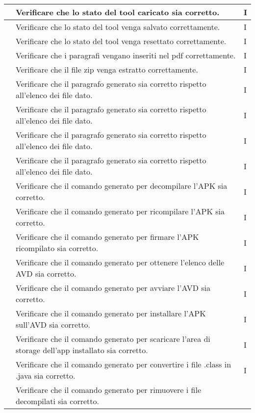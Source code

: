 \begin{longtable}{ |C{1.5cm} | C{8.5cm}| C{1.5cm} |}
     & Verificare che lo stato del tool caricato sia corretto.
    & I \\\hline
     & Verificare che lo stato del tool venga salvato correttamente.
    & I \\\hline
     & Verificare che lo stato del tool venga resettato correttamente.
    & I \\\hline
     & Verificare che i paragrafi vengano inseriti nel pdf correttamente.
    & I \\\hline
     & Verificare che il file zip venga estratto correttamente.
    & I \\\hline
     & Verificare che il paragrafo generato sia corretto rispetto all'elenco dei file dato.
    & I \\\hline
     & Verificare che il paragrafo generato sia corretto rispetto all'elenco dei file dato.
    & I \\\hline
     & Verificare che il paragrafo generato sia corretto rispetto all'elenco dei file dato.
    & I \\\hline
     & Verificare che il paragrafo generato sia corretto rispetto all'elenco dei file dato.
    & I \\\hline
     & Verificare che il comando generato per decompilare l'APK sia corretto.
    & I \\\hline
     & Verificare che il comando generato per ricompilare l'APK sia corretto.
    & I \\\hline
     & Verificare che il comando generato per firmare l'APK ricompilato sia corretto.
    & I \\\hline
     & Verificare che il comando generato per ottenere l'elenco delle AVD sia corretto.
    & I \\\hline
     & Verificare che il comando generato per avviare l'AVD sia corretto.
    & I \\\hline
     & Verificare che il comando generato per installare l'APK sull'AVD sia corretto.
    & I \\\hline
     & Verificare che il comando generato per scaricare l'area di storage dell'app installato sia corretto.
    & I \\\hline
     & Verificare che il comando generato per convertire i file .class in .java sia corretto.
    & I \\\hline
     & Verificare che il comando generato per rimuovere i file decompilati sia corretto.

\end{longtable}
